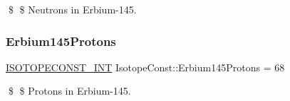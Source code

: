 \$ \$ Neutrons in Erbium-\/145. \mbox{\label{group___isotope_const-_erbium-_er145_gaf41a5ec11969f1c852b4c407b116bdbf}} 
\subsubsection{\texorpdfstring{Erbium145\+Protons}{Erbium145Protons}}
{\footnotesize\ttfamily \mbox{\hyperlink{group___isotope_const-_macros_ga5f18360b3e99483a35c32d789e62621c}{I\+S\+O\+T\+O\+P\+E\+C\+O\+N\+S\+T\+\_\+\+I\+NT}} Isotope\+Const\+::\+Erbium145\+Protons = 68}

\$ \$ Protons in Erbium-\/145. 